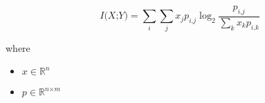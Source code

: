 \documentclass[12pt]{article}
\begin{document}
\[
\textit{I(X;Y)} = \sum_\textit{i} \sum_\textit{j} \textit{x}_{ \textit{j} }\textit{p}_{\textit{i}, \textit{j}} \log_2{ \frac{\textit{p}_{\textit{i}, \textit{j}}}{\sum_\textit{k} \textit{x}_{ \textit{k} }\textit{p}_{\textit{i}, \textit{k}}} }
\]

where
\begin{itemize}
\item $\textit{x} \in \mathbb{R}^{ \textit{n}}$
\item $\textit{p} \in \mathbb{R}^{ \textit{n} \times \textit{m} }$
\end{itemize}
\end{document}

